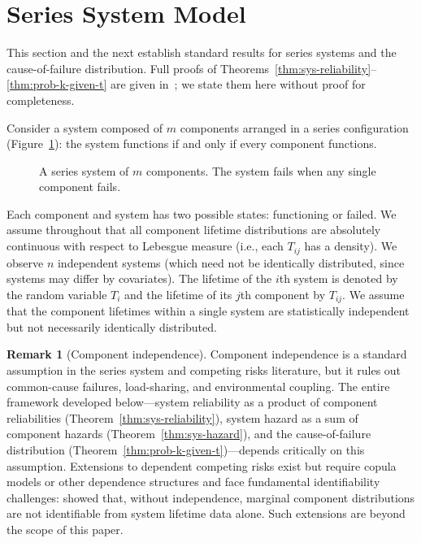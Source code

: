 \documentclass[11pt]{article}
\theoremstyle{definition}
\newtheorem{remark}{Remark}
\theoremstyle{plain}
\begin{document}
\section{Series System Model}
\label{sec:series-system}

This section and the next establish standard results for series systems
and the cause-of-failure distribution.
Full proofs of Theorems~\ref{thm:sys-reliability}--\ref{thm:prob-k-given-t}
are given in~\citet[Sections~1--2]{towell2023masters}; we state them here
without proof for completeness.

Consider a system composed of $m$ components arranged in a series
configuration (Figure~\ref{fig:series}): the system functions if and only
if every component functions.

\begin{figure}[ht]
\centering

\caption{A series system of $m$ components.
The system fails when any single component fails.}
\label{fig:series}
\end{figure}

Each component and system has two possible states: functioning or failed.
We assume throughout that all component lifetime distributions are
absolutely continuous with respect to Lebesgue measure (i.e., each
$T_{ij}$ has a density).
We observe $n$ independent systems (which need not be identically
distributed, since systems may differ by covariates).
The lifetime of the $i$th system is denoted by the random variable
$T_i$ and the lifetime of its $j$th component by $T_{ij}$.
We assume that the component lifetimes within a single system are
statistically independent but not necessarily identically distributed.

\begin{remark}[Component independence]
\label{rem:independence}
Component independence is a standard assumption in the series system
and competing risks literature, but it rules out common-cause failures,
load-sharing, and environmental coupling.
The entire framework developed below---system reliability as a product
of component reliabilities (Theorem~\ref{thm:sys-reliability}), system
hazard as a sum of component hazards (Theorem~\ref{thm:sys-hazard}),
and the cause-of-failure distribution
(Theorem~\ref{thm:prob-k-given-t})---depends critically on this
assumption.
Extensions to dependent competing risks exist but require copula models
or other dependence structures and face fundamental identifiability
challenges: \citet{tsiatis1975} showed that, without independence,
marginal component distributions are not identifiable from system
lifetime data alone.
Such extensions are beyond the scope of this paper.
\end{remark}
\end{document}
